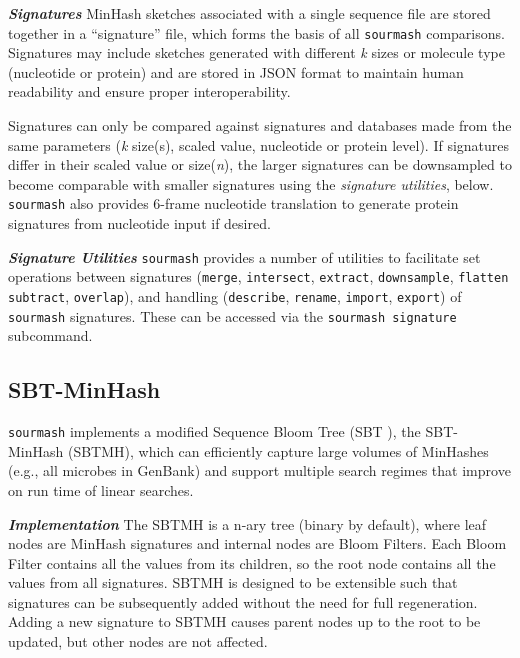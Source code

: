 \documentclass[10pt,a4paper,twocolumn]{article}
\begin{document}
 
\textit{\textbf{Signatures}} MinHash sketches associated with a single sequence file are stored together in a “signature” file, which forms the basis of all \lstinline{sourmash} comparisons. Signatures may include sketches generated with different \textit{k} sizes or molecule type (nucleotide or protein) and are stored in JSON format to maintain human readability and ensure proper interoperability. 

Signatures can only be compared against signatures and databases made from the same parameters (\textit{k} size(s), scaled value, nucleotide or protein level). If signatures differ in their scaled value or size(\textit{n}), the larger signatures can be downsampled to become comparable with smaller signatures using the \textit{signature utilities}, below. \lstinline{sourmash} also provides 6-frame nucleotide translation to generate protein signatures from nucleotide input if desired.

\textit{\textbf{Signature Utilities}} \lstinline{sourmash} provides a number of utilities to facilitate set operations between signatures (\lstinline{merge}, \lstinline{intersect}, \lstinline{extract}, \lstinline{downsample}, \lstinline{flatten} \lstinline{subtract}, \lstinline{overlap}), and handling (\lstinline{describe}, \lstinline{rename},  \lstinline{import}, \lstinline{export}) of \lstinline{sourmash} signatures. These can be accessed via the \lstinline{sourmash signature} subcommand. 

\subsection*{SBT-MinHash}
\lstinline{sourmash} implements a modified Sequence Bloom Tree (SBT \cite{solomon2016fast}), the SBT-MinHash (SBTMH), which can efficiently capture large volumes of MinHashes (e.g., all microbes in GenBank) and support multiple search regimes that improve on run time of linear searches. 

\textit{\textbf{Implementation}} The SBTMH is a n-ary tree (binary by default), where leaf nodes are MinHash signatures and internal nodes are Bloom Filters. Each Bloom Filter contains all the values from its children, so the root node contains all the values from all signatures. SBTMH is designed to be extensible such that signatures can be subsequently added without the need for full regeneration. Adding a new signature to SBTMH causes parent nodes up to the root to be updated, but other nodes are not affected.

\end{document}

